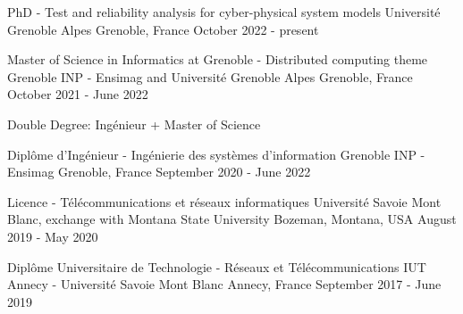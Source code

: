

\begin{cventries}

\cventry
{PhD - Test and reliability analysis for cyber-physical system models} %
{Université Grenoble Alpes} %
{Grenoble, France} %
{October 2022 - present} %
{
}

\cventry
{Master of Science in Informatics at Grenoble - Distributed computing theme} %
{Grenoble INP - Ensimag and Université Grenoble Alpes} %
{Grenoble, France} %
{October 2021 - June 2022} %
{
  \begin{cvitems}
    \item Double Degree: Ingénieur + Master of Science
  \end{cvitems}
}

\cventry
{Diplôme d'Ingénieur - Ingénierie des systèmes d'information} %
{Grenoble INP - Ensimag} %
{Grenoble, France} %
{September 2020 - June 2022} %
{
}

\cventry
{Licence - Télécommunications et réseaux informatiques} %
{Université Savoie Mont Blanc, exchange with Montana State University} %
{Bozeman, Montana, USA} %
{August 2019 - May 2020} %
{
}

\cventry
{Diplôme Universitaire de Technologie - Réseaux et Télécommunications} %
{IUT Annecy - Université Savoie Mont Blanc} %
{Annecy, France} %
{September 2017 - June 2019} %
{
}






\end{cventries}
